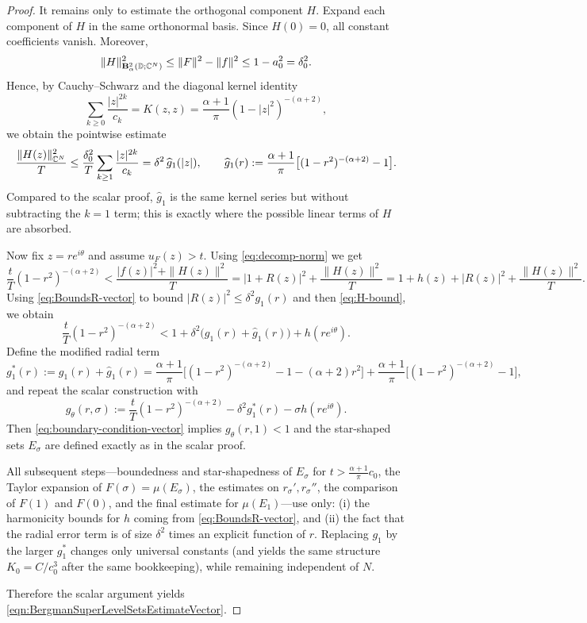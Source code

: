 \documentclass[a4paper,10pt]{amsart}
\newcommand{\D}{\mathbb{D}}
\begin{document}
\begin{proof}
It remains only to estimate the orthogonal component $H$. Expand each component of $H$ in the same orthonormal basis. Since $H(0)=0$,
all constant coefficients vanish. Moreover,
\[
\|H\|_{\mathbf B_\alpha^2(\D;\C^N)}^2 \le \|F\|^2 - \|f\|^2 \le 1-a_0^2=\delta_0^2.
\]
Hence, by Cauchy--Schwarz and the diagonal kernel identity
\[
\sum_{k\ge0}\frac{|z|^{2k}}{c_k}=K(z,z)=\frac{\alpha+1}{\pi}(1-|z|^2)^{-(\alpha+2)},
\]
we obtain the pointwise estimate
\begin{equation}\label{eq:H-bound}
\frac{\|H(z)\|_{\mathbb{C}^N}^2}{T}
\le
\frac{\delta_0^2}{T}\sum_{k\ge1}\frac{|z|^{2k}}{c_k}
=
\delta^2\,\widehat g_1(|z|),
\qquad
\widehat g_1(r):=\frac{\alpha+1}{\pi}\big[(1-r^2)^{-(\alpha+2)}-1\big].
\end{equation}
Compared to the scalar proof, $\widehat g_1$ is the same kernel series but without subtracting
the $k=1$ term; this is exactly where the possible linear terms of $H$ are absorbed.

Now fix $z=re^{i\theta}$ and assume $u_F(z)>t$. Using \eqref{eq:decomp-norm} we get
\[
\frac{t}{T}(1-r^2)^{-(\alpha+2)}
<
\frac{|f(z)|^2+\|H(z)\|^2}{T}
=
|1+R(z)|^2+\frac{\|H(z)\|^2}{T}
=
1+h(z)+|R(z)|^2+\frac{\|H(z)\|^2}{T}.
\]
Using \eqref{eq:BoundsR-vector} to bound $|R(z)|^2\le \delta^2 g_1(r)$ and then \eqref{eq:H-bound}, we obtain
\begin{equation}\label{eq:boundary-condition-vector}
\frac{t}{T}(1-r^2)^{-(\alpha+2)}
<
1+\delta^2\big(g_1(r)+\widehat g_1(r)\big)+h(re^{i\theta}).
\end{equation}
Define the modified radial term
\[
g_1^\ast(r):=g_1(r)+\widehat g_1(r)
=\frac{\alpha+1}{\pi}\big[(1-r^2)^{-(\alpha+2)}-1-(\alpha+2)r^2\big]
+\frac{\alpha+1}{\pi}\big[(1-r^2)^{-(\alpha+2)}-1\big],
\]
and repeat the scalar construction with
\[
g_\theta(r,\sigma):=\frac{t}{T}(1-r^2)^{-(\alpha+2)}-\delta^2 g_1^\ast(r)-\sigma h(re^{i\theta}).
\]
Then \eqref{eq:boundary-condition-vector} implies $g_\theta(r,1)<1$ and the star-shaped sets $E_\sigma$
are defined exactly as in the scalar proof.

All subsequent steps---boundedness and star-shapedness of $E_\sigma$ for $t>\frac{\alpha+1}{\pi}c_0$,
the Taylor expansion of $F(\sigma)=\mu(E_\sigma)$, the estimates on $r_\sigma',r_\sigma''$,
the comparison of $F(1)$ and $F(0)$, and the final estimate for $\mu(E_1)$---use only:
(i) the harmonicity bounds for $h$ coming from \eqref{eq:BoundsR-vector}, and
(ii) the fact that the radial error term is of size $\delta^2$ times an explicit function of $r$.
Replacing $g_1$ by the larger $g_1^\ast$ changes only universal constants (and yields the same structure
$K_0=C/c_0^3$ after the same bookkeeping), while remaining independent of $N$.

Therefore the scalar argument yields \eqref{eqn:BergmanSuperLevelSetsEstimateVector}.
\end{proof}
\end{document}
